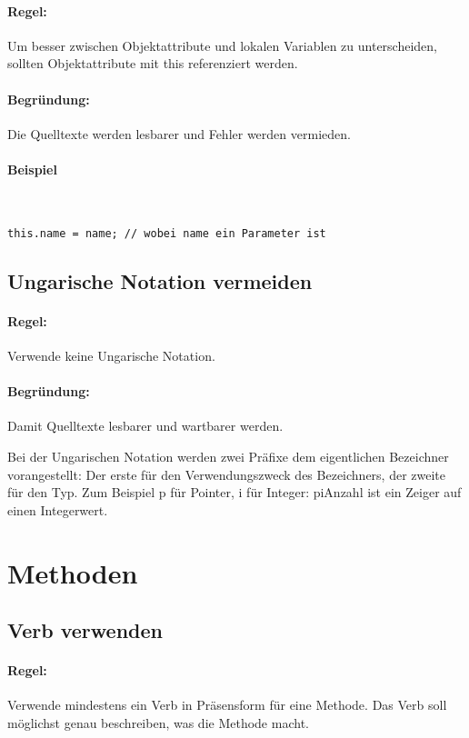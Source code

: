 \paragraph{Regel:} Um besser zwischen Objektattribute und lokalen Variablen zu unterscheiden, sollten Objektattribute mit this referenziert werden.
\paragraph{Begründung:} Die Quelltexte werden lesbarer und Fehler werden vermieden.

\paragraph{Beispiel} \hspace{0pt}\\
\begin{lstlisting}
this.name = name; // wobei name ein Parameter ist
\end{lstlisting}


\subsection{Ungarische Notation vermeiden}

\paragraph{Regel:} Verwende keine Ungarische Notation.
\paragraph{Begründung:} Damit Quelltexte lesbarer und wartbarer werden.

Bei der Ungarischen Notation werden zwei Präfixe dem eigentlichen Bezeichner vorangestellt: Der erste für den Verwendungszweck des Bezeichners, der zweite für den Typ. Zum Beispiel p für Pointer, i für Integer: piAnzahl ist ein Zeiger auf einen Integerwert.


\section{Methoden}

\subsection{Verb verwenden}

\paragraph{Regel:} Verwende mindestens ein Verb in Präsensform für eine Methode. Das Verb soll möglichst genau beschreiben, was die Methode macht.
